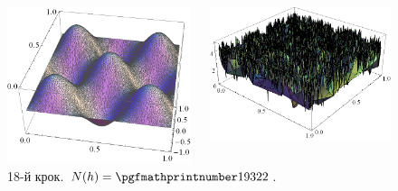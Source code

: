 \begin{frame}[allowframebreaks]
		\begin{figure}[H]
			\begin{columns}
			 	\begin{column}{0.5\textwidth}
			 		\includegraphics[width=\textwidth]{problem1/my/solutions/18}
			 	 \end{column}
			     \begin{column}{0.5\textwidth}
			     	\includegraphics[width=\textwidth]{problem1/my/AEE/18}
			     \end{column}
		     \end{columns}
		     \caption*{18-й крок. $N(h) = \nn{19322}$.}
		\end{figure}
\end{frame}

